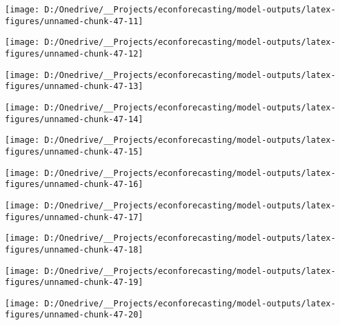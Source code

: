 \documentclass[11pt, letterpaper]{article}\usepackage[]{graphicx}\usepackage[]{color}
\begin{document}
{\centering \texttt{[image: D:/Onedrive/\_\_Projects/econforecasting/model-outputs/latex-figures/unnamed-chunk-47-11]} 

}




{\centering \texttt{[image: D:/Onedrive/\_\_Projects/econforecasting/model-outputs/latex-figures/unnamed-chunk-47-12]} 

}




{\centering \texttt{[image: D:/Onedrive/\_\_Projects/econforecasting/model-outputs/latex-figures/unnamed-chunk-47-13]} 

}




{\centering \texttt{[image: D:/Onedrive/\_\_Projects/econforecasting/model-outputs/latex-figures/unnamed-chunk-47-14]} 

}




{\centering \texttt{[image: D:/Onedrive/\_\_Projects/econforecasting/model-outputs/latex-figures/unnamed-chunk-47-15]} 

}




{\centering \texttt{[image: D:/Onedrive/\_\_Projects/econforecasting/model-outputs/latex-figures/unnamed-chunk-47-16]} 

}




{\centering \texttt{[image: D:/Onedrive/\_\_Projects/econforecasting/model-outputs/latex-figures/unnamed-chunk-47-17]} 

}




{\centering \texttt{[image: D:/Onedrive/\_\_Projects/econforecasting/model-outputs/latex-figures/unnamed-chunk-47-18]} 

}




{\centering \texttt{[image: D:/Onedrive/\_\_Projects/econforecasting/model-outputs/latex-figures/unnamed-chunk-47-19]} 

}




{\centering \texttt{[image: D:/Onedrive/\_\_Projects/econforecasting/model-outputs/latex-figures/unnamed-chunk-47-20]} 

}
\end{document}
